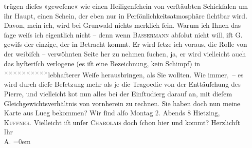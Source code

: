 \begin{ledgroupsized}[t]{13cm}
               trügen dieſes »geweſene« wie einen Heiligenſchein von verſtäubten Schickſalen um ihr
               Haupt, einen Schein, der eben nur in Perſönlichkeitsatmosphäre ſichtbar {\pb}wird. Davon, mein ich, wird bei Grunwald nichts merklich ſein. Warum ich Ihnen das ſage weiſs
               ich eigentlich nicht – denn wenn \textsc{Bassermann} abſolut nicht will, iſt G. gewiſs der
               einzige, der in Betracht kommt. Er wird ſetze ich voraus, die Rolle von der weibiſch
                   – verwöhnten Seite her zu nehmen ſuchen,  ja, er wird vielleicht auch das hyſteriſch
               verlogene (es iſt eine Bezeichnung, kein Schimpf) in \substVorne{}\textsuperscript{\textcolor{gray}{×}\-\textcolor{gray}{×}\-\textcolor{gray}{×}\-\textcolor{gray}{×}\-\textcolor{gray}{×}\-\textcolor{gray}{×}\-\textcolor{gray}{×}\-\textcolor{gray}{×}\-\textcolor{gray}{×}\-\textcolor{gray}{×}}\substDazwischen{}lebhafterer\substHinten{} Weiſe herausbringen, als Sie wollten. Wie immer, – es {\pb}wird durch dieſe Beſetzung  mehr als je die Tragoedie von der Enttäuſchung des Pierre, und vielleicht ko{\geminationm}t nun alles bei der Einſtudierg darauf an, mit dieſem
               Gleichgewichtsverhältnis von vornherein zu rechnen.\pend
           \pstart
           Sie haben doch nun meine Karte aus Lueg bekommen?
               Wir ſind alſo Montag 2.{ }Abends 8{ }Hietzing, \textsc{Kuffner}. Vielleicht iſt unſer \textsc{Charolais} doch ſchon hier und kommt?\pend
           \pstart
           Herzlichſt Ihr{\\[\baselineskip]}\spacefill\mbox{A.}\pend
           \leftskip=0em{}
         
         \endnumbering{}\end{ledgroupsized}  \newcommand{\dateiname}{L01488}\newcommand{\titel}{Arthur Schnitzler an Hugo von Hofmannsthal, 31. 12. 1904}\newcommand{\editorInnen}{Martin Anton Müller und Gerd-Hermann Susen}
      